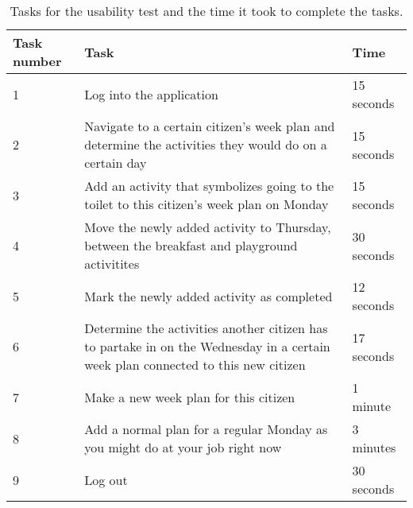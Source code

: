 \begin{table}[H]
    \small
    \begin{tabular}{|p{1.3cm}|p{10cm}|p{1.8cm}|}
    \hline
    Task number      &Task                                                                                                                & Time      \\ \hline
    1 & Log into the application                                                                                                               & 15 seconds  \\ \hline
    2 & Navigate to a certain citizen's week plan and determine the activities they would do on a certain day                              & 15 seconds  \\ \hline
    3 & Add an activity that symbolizes going to the toilet to this citizen's week plan on Monday                                          &  15 seconds \\ \hline
    4 & Move the newly added activity to Thursday, between the breakfast and playground activitites                                        & 30 seconds   \\ \hline
    5 & Mark the newly added activity as completed                                                                                            & 12 seconds   \\ \hline
    6 & Determine the activities another citizen has to partake in on the Wednesday in a certain week plan connected to this new citizen     & 17 seconds   \\ \hline
    7 & Make a new week plan for this citizen                                                                                                & 1 minute   \\ \hline
    8 & Add a normal plan for a regular Monday as you might do at your job right now                                                          & 3 minutes   \\ \hline
    9 & Log out                                                                                                                              & 30 seconds   \\ \hline
    \end{tabular}
    \caption{Tasks for the usability test and the time it took to complete the tasks.}\label{table:usability_tasks}
\end{table}

